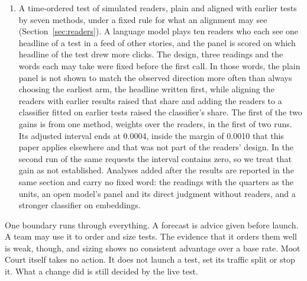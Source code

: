 \documentclass[sigconf,nonacm]{acmart}
\begin{document}
\begin{enumerate}
\item A time-ordered test of simulated readers, plain and aligned with earlier tests by seven methods, under a fixed rule for what an alignment may see (Section~\ref{sec:readers}). A language model plays ten readers who each see one headline of a test in a feed of other stories, and the panel is scored on which headline of the test drew more clicks. The design, three readings and the words each may take were fixed before the first call. In those words, the plain panel is not shown to match the observed direction more often than always choosing the earliest arm, the headline written first, while aligning the readers with earlier results raised that share and adding the readers to a classifier fitted on earlier tests raised the classifier's share. The first of the two gains is from one method, weights over the readers, in the first of two runs. Its adjusted interval ends at 0.0004, inside the margin of 0.0010 that this paper applies elsewhere and that was not part of the readers' design. In the second run of the same requests the interval contains zero, so we treat that gain as not established. Analyses added after the results are reported in the same section and carry no fixed word: the readings with the quarters as the units, an open model's panel and its direct judgment without readers, and a stronger classifier on embeddings.
\end{enumerate}
One boundary runs through everything. A forecast is advice given before launch. A team may use it to order and size tests. The evidence that it orders them well is weak, though, and sizing shows no consistent advantage over a base rate. Moot Court itself takes no action. It does not launch a test, set its traffic split or stop it. What a change did is still decided by the live test.
\end{document}
